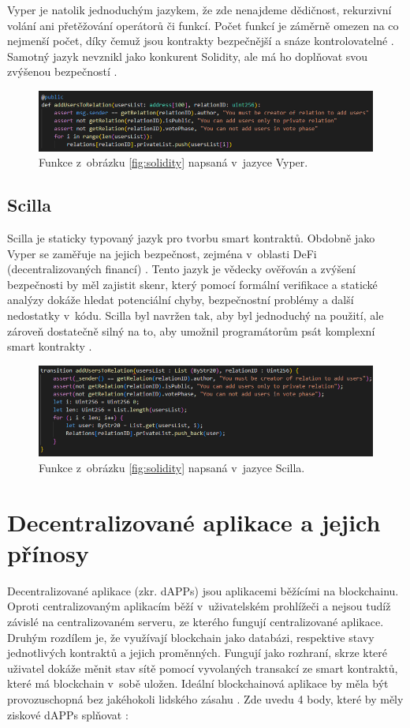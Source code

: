 Vyper je natolik jednoduchým jazykem, že zde nenajdeme dědičnost, rekurzivní volání ani přetěžování operátorů či funkcí. Počet funkcí je záměrně omezen na co nejmenší počet, díky čemuž jsou kontrakty bezpečnější a snáze kontrolovatelné \cite{vyper2}. Samotný jazyk nevznikl jako konkurent Solidity, ale má ho doplňovat svou zvýšenou bezpečností \cite{vyper3}. 

\begin{figure}
\centering
\includegraphics[width=\textwidth]{obrazky/Vyper.png}
\caption{Funkce z~obrázku \ref{fig:solidity} napsaná v~jazyce Vyper.}
\end{figure}

\subsection{Scilla}
Scilla je staticky typovaný jazyk pro tvorbu smart kontraktů. Obdobně jako Vyper se zaměřuje na jejich bezpečnost, zejména v~oblasti DeFi (decentralizovaných financí) \cite{scilla1}. Tento jazyk je vědecky ověřován a zvýšení bezpečnosti by měl zajistit skenr, který pomocí formální verifikace a statické analýzy dokáže hledat potenciální chyby, bezpečnostní problémy a další nedostatky v~kódu. Scilla byl navržen tak, aby byl jednoduchý na použití, ale zároveň dostatečně silný na to, aby umožnil programátorům psát komplexní smart kontrakty \cite{scilla2}.

\begin{figure}
\centering
\includegraphics[width=\textwidth]{obrazky/Scilla.png}
\caption{Funkce z~obrázku \ref{fig:solidity} napsaná v~jazyce Scilla.}
\centering
\end{figure}

\section{Decentralizované aplikace a jejich přínosy}
Decentralizované aplikace (zkr. dAPPs) jsou aplikacemi běžícími na blockchainu. Oproti centralizovaným aplikacím běží v~uživatelském prohlížeči a nejsou tudíž závislé na centralizovaném serveru, ze kterého fungují centralizované aplikace. Druhým rozdílem je, že využívají blockchain jako databázi, respektive stavy jednotlivých kontraktů a jejich proměnných. Fungují jako rozhraní, skrze které uživatel dokáže měnit stav sítě pomocí vyvolaných transakcí ze smart kontraktů, které má blockchain v~sobě uložen. Ideální blockchainová aplikace by měla být provozuschopná bez jakéhokoli lidského zásahu \cite{dapps}. Zde uvedu 4 body, které by měly ziskové dAPPs splňovat \cite{Raval2016}: 

